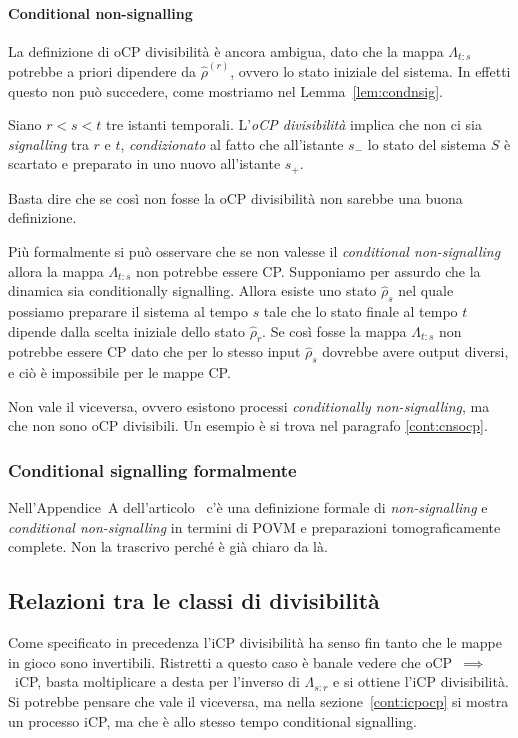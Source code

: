 \documentclass[a4]{article}
\begin{document}
\paragraph{Conditional non-signalling}
La definizione di oCP divisibilità è ancora ambigua, dato che la mappa \(\Lambda_{t\colon s}\)
potrebbe a priori dipendere da \(\hat{\rho}^{(r)}\), ovvero lo stato iniziale del sistema.
In effetti questo non può succedere, come mostriamo nel Lemma~\ref{lem:condnsig}.
\begin{lem}  \label{lem:condnsig}
	Siano \(r<s<t\) tre istanti temporali. L'\emph{oCP divisibilità} implica che non ci
	sia \emph{signalling} tra \(r\) e \(t\), \emph{condizionato} al fatto che all'istante
	\(s_-\) lo stato del sistema \(S\) è scartato e preparato in uno nuovo all'istante \(s_+\).
	
	\proof Basta dire che se così non fosse la oCP divisibilità non sarebbe una buona
	definizione. 
	
	Più formalmente si può osservare che se non valesse il \emph{conditional non-signalling}
	allora la mappa \(\Lambda_{t\colon s}\) non potrebbe essere CP. 
	Supponiamo per assurdo che la dinamica sia conditionally signalling. Allora esiste
	uno stato \(\hat{\rho}_s\) nel quale possiamo preparare il sistema al tempo \(s\)
	tale che lo stato finale al tempo \(t\) dipende dalla scelta iniziale dello stato
	 \(\hat{\rho}_r\). Se così fosse la mappa \(\Lambda_{t\colon s}\) non potrebbe essere
	 CP dato che per lo stesso input \(\hat{\rho}_s\) dovrebbe avere output diversi, e ciò
	 è impossibile per le mappe CP.
\end{lem}
\begin{ach}
	Non vale il viceversa, ovvero esistono processi \emph{conditionally non-signalling}, ma
	che non sono oCP divisibili. Un esempio è si trova nel paragrafo \ref{cont:cnsocp}.
\end{ach}

\subsubsection{Conditional signalling formalmente}
Nell'Appendice~A dell'articolo~\cite{CPdoesnotimply} c'è una definizione formale di
\emph{non-signalling} e \emph{conditional non-signalling} in termini di POVM e preparazioni
tomograficamente complete. Non la trascrivo perché è già chiaro da là.

\subsection{Relazioni tra le classi di divisibilità}
Come specificato in precedenza l'iCP divisibilità ha senso fin tanto che le mappe in gioco
sono invertibili. Ristretti a questo caso è banale vedere che oCP~\(\implies\)~iCP, basta 
moltiplicare a desta per l'inverso di \(\Lambda_{s\colon r}\) e si ottiene l'iCP divisibilità.
Si potrebbe pensare che vale il viceversa, ma nella sezione~\ref{cont:icpocp} si mostra
un processo iCP, ma che è allo stesso tempo conditional signalling.
\end{document}
